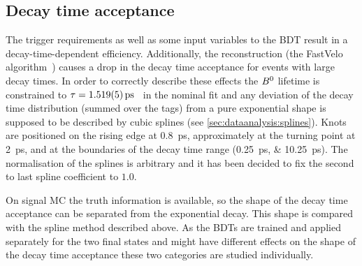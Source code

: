 \subsection{Decay time acceptance}
\label{sec:b02dd:decaytimefit:acceptance}

The trigger requirements as well as some input variables to the BDT result in
a decay-time-dependent efficiency. Additionally, the \velo reconstruction
(\ie the FastVelo algorithm~\cite{Callot:2011bza}) causes a drop in the decay time
acceptance for events with large decay times. In order to correctly describe
these effects the ${{B}^0}$ lifetime is constrained to $\tau =
\SI{1.519\pm0.005}{\ps}$~\cite{PDG2014} in the nominal fit and any deviation
of the decay time distribution (summed over the tags) from a pure exponential
shape is supposed to be described by cubic splines (see
\cref{sec:dataanalysis:splines}). Knots are positioned on the rising edge at
\SI{0.8}{\ps}, approximately at the turning point at \SI{2}{\ps}, and at the
boundaries of the decay time range (\SIlist{0.25;10.25}{\ps}). The
normalisation of the splines is arbitrary and it has been decided to fix the
second to last spline coefficient to $\num{1.0}$.

On signal MC the truth information is available, so the shape of the decay time
acceptance can be separated from the exponential decay. This shape is compared
with the spline method described above. As the BDTs are trained and applied
separately for the two final states and might have different effects on the
shape of the decay time acceptance these two categories are studied
individually.

